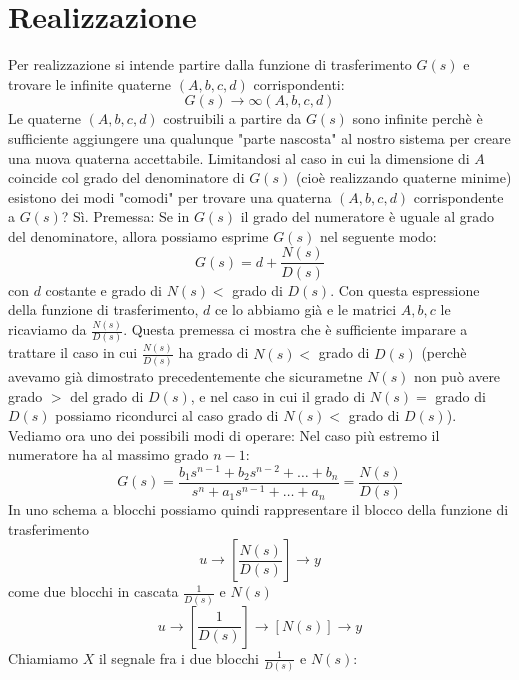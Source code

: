 \section{Realizzazione}
Per realizzazione si intende partire dalla funzione di trasferimento $G(s)$ e trovare le infinite quaterne $(A,b,c,d)$ corrispondenti: 
\[
    G(s) \rightarrow \infty(A,b,c,d)
\]
Le quaterne $(A,b,c,d)$ costruibili a partire da $G(s)$ sono infinite perchè è sufficiente aggiungere una qualunque "parte nascosta" al nostro sistema per creare una nuova quaterna accettabile.\newline
\newline
Limitandosi al caso in cui la dimensione di $A$ coincide col grado del denominatore di $G(s)$ (cioè realizzando quaterne minime) esistono dei modi "comodi" per trovare una quaterna $(A,b,c,d)$ corrispondente a $G(s)$? Sì.\newline
\newline
Premessa: Se in $G(s)$ il grado del numeratore è uguale al grado del denominatore, allora possiamo esprime $G(s)$ nel seguente modo:
\[
    G(s) = d + \frac{N(s)}{D(s)}
\]
con $d$ costante e grado di $N(s) <$ grado di $D(s)$.\newline
Con questa espressione della funzione di trasferimento, $d$ ce lo abbiamo già e le matrici $A,b,c$ le ricaviamo da $\frac{N(s)}{D(s)}$.\newline
\newline
Questa premessa ci mostra che è sufficiente imparare a trattare il caso in cui $\frac{N(s)}{D(s)}$ ha grado di $N(s) <$ grado di $D(s)$ (perchè avevamo già dimostrato precedentemente che sicurametne $N(s)$ non può avere grado $>$ del grado di $D(s)$, e nel caso in cui il grado di $N(s) = $ grado di $D(s)$ possiamo ricondurci al caso grado di $N(s) <$ grado di $D(s)$).\newline
\newline
Vediamo ora uno dei possibili modi di operare:\newline
Nel caso più estremo il numeratore ha al massimo grado $n-1$:
\[
    G(s) = \frac{ b_1 s^{n-1} + b_2 s^{n-2} + \dots + b_n }{ s^n + a_1 s^{n-1} + \dots + a_n } = \frac{N(s)}{D(s)}
\]
In uno schema a blocchi possiamo quindi rappresentare il blocco della funzione di trasferimento 
\[
    u \rightarrow \left[\frac{N(s)}{D(s)}\right] \rightarrow y
\]
come due blocchi in cascata $\frac{1}{D(s)}$ e $N(s)$
\[
    u \rightarrow \left[\frac{1}{D(s)}\right] \rightarrow \left[N(s)\right] \rightarrow  y
\]
Chiamiamo $X$ il segnale fra i due blocchi $\frac{1}{D(s)}$ e $N(s)$:
